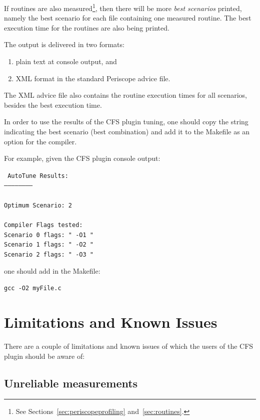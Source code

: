 \documentclass[11pt,a4paper, oneside]{book} %
\newenvironment{code}%
{
\addtolength{\leftskip}{0.5cm}}%
{

}
\begin{document}
If routines are also measured\footnote{See Sections~\ref{sec:periscopeprofiling} and~\ref{sec:routines}. }, then there will be  more \textit{best scenarios} printed, namely the best scenario for each file containing one measured routine. The best execution time for the routines are also being printed.

The output is delivered in two formats:
\begin{enumerate}
	\item plain text at console output, and
	\item XML format in the standard Periscope advice file.
\end{enumerate}

The XML advice file also contains the routine execution times for all scenarios, besides the best execution time.

In order to use the results of the CFS plugin tuning, one should copy the string indicating the best scenario (best combination) and add it to the Makefile as an option for the compiler.

For example, given the CFS plugin console output:

\begin{code}
\texttt{
AutoTune Results:\\
-----------------------\\
\\
Optimum Scenario: 2\\
\\
Compiler Flags tested:\\
Scenario 0 flags: " -O1 "\\
Scenario 1 flags: " -O2 "\\
Scenario 2 flags: " -O3 "\\
}
\end{code}

one should add in the Makefile:

\begin{code}
\texttt{gcc -O2 myFile.c}
\end{code}


\chapter{Limitations and Known Issues}
There are a couple of limitations and known issues of which the users of the CFS plugin should be aware of:

\section{Unreliable measurements}\label{sec:limitationstime}
\end{document}
